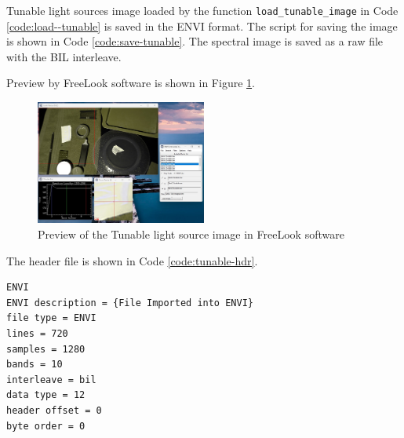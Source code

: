 Tunable light sources image loaded by the function
\texttt{load\_tunable\_image} in Code \ref{code:load--tunable} is
saved in the ENVI format.
The script for saving the image is shown in Code \ref{code:save-tunable}.
The spectral image is saved as a raw file with the BIL interleave.

Preview by FreeLook software is shown in Figure \ref{fig:tunable-preview}.
\begin{figure}[H]
  \centering
  \caption{Preview of the Tunable light source image in FreeLook software}
  \label{fig:tunable-preview}
  \includegraphics[width=0.5\textwidth]{./fig-task3/tunable.jpg}
\end{figure}

The header file is shown in Code \ref{code:tunable-hdr}.

\begin{lstlisting}[caption=Saved ENVI header file, label={code:tunable-hdr}]
ENVI
ENVI description = {File Imported into ENVI}
file type = ENVI
lines = 720
samples = 1280
bands = 10
interleave = bil
data type = 12
header offset = 0
byte order = 0

\end{lstlisting}

